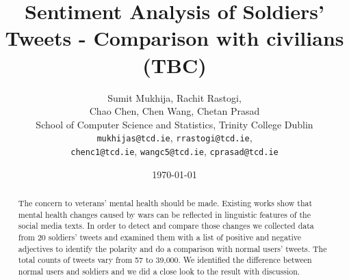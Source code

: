 \documentclass[english,a4paper,11pt]{article}
\title{Sentiment Analysis of Soldiers' Tweets - Comparison with civilians (TBC)}
\date{\today}
\author{
  Sumit Mukhija, Rachit Rastogi,\\
  Chao Chen, Chen Wang, Chetan Prasad\\
  School of Computer Science and Statistics, Trinity College Dublin\\
  \texttt{mukhijas@tcd.ie}, \texttt{rrastogi@tcd.ie},\\
  \texttt{chenc1@tcd.ie}, \texttt{wangc5@tcd.ie}, \texttt{cprasad@tcd.ie}
}
\begin{document}
\maketitle
\thispagestyle{empty}
\pagestyle{empty}

\begin{abstract}
The concern to veterans' mental health should be made. Existing works show that
mental health changes caused by wars can be reflected in linguistic features of
the social media texts. In order to detect and compare those changes we collected
data from 20 soldiers' tweets and examined them with a list of positive and negative
adjectives to identify the polarity and do a comparison with normal users'
tweets. The total counts of tweets vary from 57 to 39,000. We identified the
difference between normal users and soldiers and we did a close look to the
result with discussion.
\end{abstract}











\end{document}
